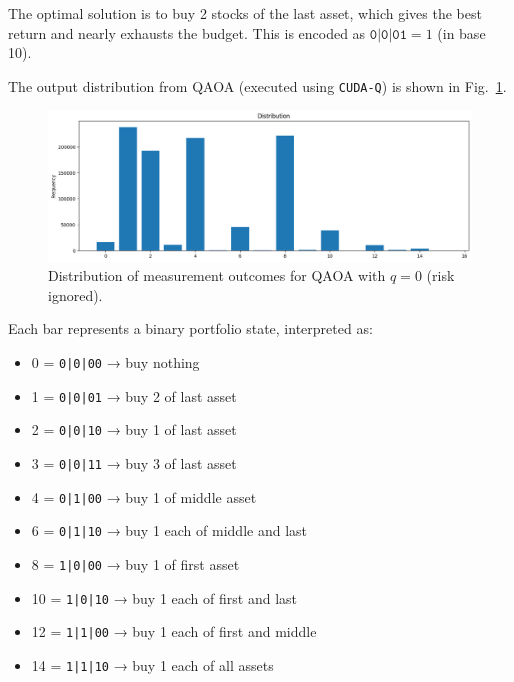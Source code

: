 The optimal solution is to buy 2 stocks of the last asset, which gives the best return and nearly exhausts the budget. This is encoded as \( \texttt{0|0|01} = 1 \) (in base 10).

The output distribution from QAOA (executed using \texttt{CUDA-Q}) is shown in Fig.~\ref{fig:distribution_q0}.

\begin{figure}[H]
    \centering
    \includegraphics[width=\textwidth]{figures/report_1/distribution_q0.png}
    \caption{Distribution of measurement outcomes for QAOA with \( q = 0 \) (risk ignored).}
    \label{fig:distribution_q0}
\end{figure}

Each bar represents a binary portfolio state, interpreted as:
\begin{itemize}
    \item 0 = \texttt{0|0|00} → buy nothing
    \item 1 = \texttt{0|0|01} → buy 2 of last asset
    \item 2 = \texttt{0|0|10} → buy 1 of last asset
    \item 3 = \texttt{0|0|11} → buy 3 of last asset
    \item 4 = \texttt{0|1|00} → buy 1 of middle asset
    \item 6 = \texttt{0|1|10} → buy 1 each of middle and last
    \item 8 = \texttt{1|0|00} → buy 1 of first asset
    \item 10 = \texttt{1|0|10} → buy 1 each of first and last
    \item 12 = \texttt{1|1|00} → buy 1 each of first and middle
    \item 14 = \texttt{1|1|10} → buy 1 each of all assets
\end{itemize}